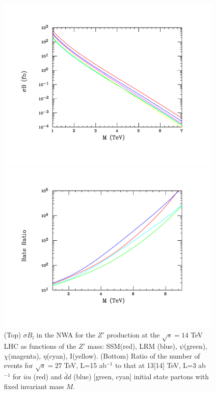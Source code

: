 \documentclass[14pt]{article}
\begin{document}
\begin{figure}[htbp]
\centerline{\includegraphics[width=5.0in,angle=0]{figures/zp14tev-ref.pdf}}
\vspace*{-2.5cm}
\centerline{\includegraphics[width=5.0in,angle=0]{figures/scaled-ratio.pdf}}
\vspace*{-1.30cm}
\caption{(Top) $\sigma B_l$ in the NWA for the $Z'$ production at the $\sqrt s=14$ TeV LHC as functions of the $Z'$ mass: SSM(red), LRM (blue), $\psi$(green), $\chi$(magenta), 
$\eta$(cyan), I(yellow).  (Bottom) Ratio of the number of events  for $\sqrt s=27$ TeV, L=15 ab$^{-1}$ to that at 13[14] TeV, L=3 ab$^{-1}$ for 
$\bar u u$ (red) and $\bar d d$ (blue)  [green, cyan] initial state partons with fixed invariant mass $M$.}
\label{toy}
\end{figure}
\end{document}
